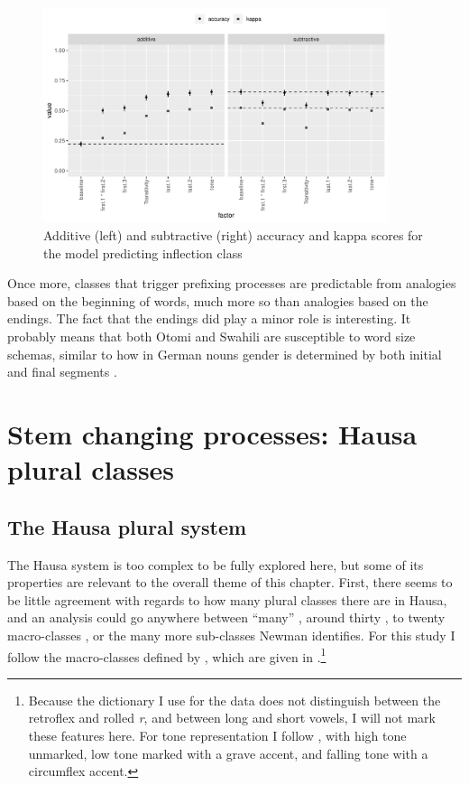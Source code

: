 \begin{figure}
  \centering
  \includegraphics[width=0.9\textwidth]{./figures/otomi/fact-imp.pdf}
  \caption{Additive (left) and subtractive (right) accuracy and kappa scores for the model predicting inflection class}\label{fig:fact-imp-otomi}
\end{figure}
\largerpage
Once more, classes that trigger prefixing processes are predictable from analogies based on the beginning of words, much more so than analogies based on the endings. The fact that the endings did play a minor role is interesting. It probably means that both Otomi and Swahili are susceptible to word size schemas, similar to how in German nouns gender is determined by both initial and final segments \autocite{Kopcke.1984}.%
%
%

\section{Stem changing processes: Hausa plural classes}


\subsection{The Hausa plural system}

The Hausa  system is too complex to be fully explored here, but some of its properties are relevant to the overall theme of this chapter. First, there seems to be little agreement with regards to how many plural classes there are in Hausa, and an analysis could go anywhere between ``many'' \autocite{Migeod.1914}, around thirty \autocite{Schon.1862}, to twenty macro-classes \autocite{Newman.2000}, or the many more sub-classes Newman identifies. For this study I follow the macro-classes defined by \textcite{Newman.2000}, which are given in .\footnote{Because the dictionary I use for the data \autocite{Bargery.1951} does not distinguish between the retroflex and rolled \textit{r}, and between long and short vowels, I will not mark these features here. For tone representation I follow \textcite{Newman.2000}, with high tone unmarked, low tone marked with a grave accent, and falling tone with a circumflex accent.}

